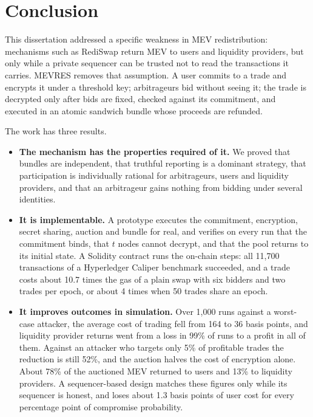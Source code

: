 \section{Conclusion}

This dissertation addressed a specific weakness in MEV redistribution: mechanisms such as RediSwap return MEV to users and liquidity providers, but only while a private sequencer can be trusted not to read the transactions it carries. MEVRES removes that assumption. A user commits to a trade and encrypts it under a threshold key; arbitrageurs bid without seeing it; the trade is decrypted only after bids are fixed, checked against its commitment, and executed in an atomic sandwich bundle whose proceeds are refunded.

The work has three results.

\begin{itemize}
    \item \textbf{The mechanism has the properties required of it.} We proved that bundles are independent, that truthful reporting is a dominant strategy, that participation is individually rational for arbitrageurs, users and liquidity providers, and that an arbitrageur gains nothing from bidding under several identities.
    \item \textbf{It is implementable.} A prototype executes the commitment, encryption, secret sharing, auction and bundle for real, and verifies on every run that the commitment binds, that $t$ nodes cannot decrypt, and that the pool returns to its initial state. A Solidity contract runs the on-chain steps: all 11{,}700 transactions of a Hyperledger Caliper benchmark succeeded, and a trade costs about 10.7 times the gas of a plain swap with six bidders and two trades per epoch, or about 4 times when 50 trades share an epoch.
    \item \textbf{It improves outcomes in simulation.} Over 1{,}000 runs against a worst-case attacker, the average cost of trading fell from 164 to 36 basis points, and liquidity provider returns went from a loss in 99\% of runs to a profit in all of them. Against an attacker who targets only 5\% of profitable trades the reduction is still 52\%, and the auction halves the cost of encryption alone. About 78\% of the auctioned MEV returned to users and 13\% to liquidity providers. A sequencer-based design matches these figures only while its sequencer is honest, and loses about 1.3 basis points of user cost for every percentage point of compromise probability.
\end{itemize}

